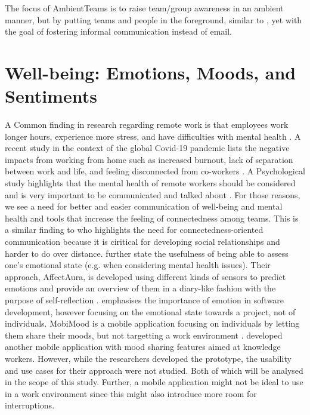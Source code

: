 The focus of AmbientTeams is to raise team/group awareness in an ambient manner, but by putting teams and people in the foreground, similar to \autocite{whittaker2004contactmap}, yet with the goal of fostering informal communication instead of email.

\section{Well-being: Emotions, Moods, and Sentiments}
A Common finding in research regarding remote work is that employees work longer hours, experience more stress, and have difficulties with mental health \autocite{mswellbeing, mulki2009set, qualtricksmental}. A recent study in the context of the global Covid-19 pandemic lists the negative impacts from working from home such as increased burnout, lack of separation between work and life, and feeling disconnected from co-workers \autocite{mswellbeing}. A Psychological study highlights that the mental health of remote workers should be considered and is very important to be communicated and talked about \autocite{grant2013exploration}. For those reasons, we see a need for better and easier communication of well-being and mental health and tools that increase the feeling of connectedness among teams. This is a similar finding to \textcite{kuwabara2002connectedness} who highlights the need for connectedness-oriented communication because it is ciritical for developing social relationships and harder to do over distance. \textcite{mcduff2012affectaura} further state the usefulness of being able to assess one's emotional state (e.g. when considering mental health issues). Their approach, AffectAura, is developed using different kinds of sensors to predict emotions and provide an overview of them in a diary-like fashion with the purpose of self-reflection \autocite{dullemond2013fixing}. \textcite{guzman2013towards} emphasises the importance of emotion in software development, however focusing on the emotional state towards a project, not of individuals. MobiMood is a mobile application focusing on individuals by letting them share their moods, but not targetting a work environment \autocite{church2010study}. \textcite{saari2008mobile} developed another mobile application with mood sharing features aimed at knowledge workers. However, while the researchers developed the prototype, the usability and use cases for their approach were not studied. Both of which will be analysed in the scope of this study. Further, a mobile application might not be ideal to use in a work environment since this might also introduce more room for interruptions.

